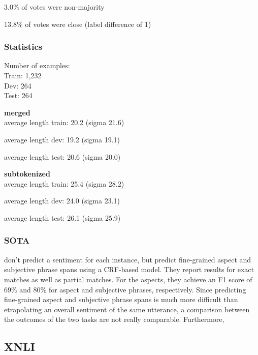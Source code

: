 3.0\% of votes were non-majority

13.8\% of votes were close (label difference of 1)

\subsubsection{Statistics}

Number of examples: \\
Train: 1,232 \\
Dev: 264 \\
Test: 264

\textbf{merged} \\
average length train: 20.2 (sigma 21.6)

average length dev: 19.2 (sigma 19.1)

average length test: 20.6 (sigma 20.0)

\textbf{subtokenized} \\

average length train: 25.4 (sigma 28.2)

average length dev: 24.0 (sigma 23.1)

average length test: 26.1 (sigma 25.9)

\subsubsection{SOTA}

\cite{sanger2016scare} don't predict a sentiment for each instance, but predict fine-grained aspect and subjective phrase spans using a CRF-based model.
They report results for exact matches as well as partial matches.
For the aspects, they achieve an F1 score of 69\% and 80\% for aspect and subjective phrases, respectively.
Since predicting fine-grained aspect and subjective phrase spans is much more difficult than etrapolating an overall sentiment of the same utterance, a comparison between the outcomes of the two tasks are not really comparable.
Furthermore, 

\subsection{XNLI}

